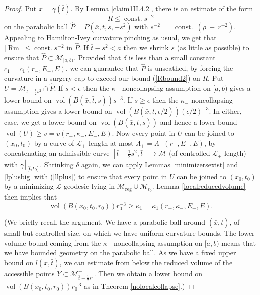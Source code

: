 \documentclass[12pt]{amsart}
\newcommand{\const}{\operatorname{const.}}
\renewcommand{\L}{{\mathcal L}}
\newcommand{\La}{\Lambda}
\newcommand{\M}{{\mathcal M}}
\newcommand{\reg}{\operatorname{reg}}
\newcommand{\restr}{\mbox{\Large \(|\)\normalsize}}
\newcommand{\Rm}{\operatorname{Rm}}
\newcommand{\vol}{\operatorname{vol}}
\newcommand{\de}{\delta}
\newcommand{\ga}{\gamma}
\newcommand{\ra}{\rightarrow}
\numberwithin{equation}{section}
\theoremstyle{plain}
\theoremstyle{definition}
\theoremstyle{remark}
\begin{document}
\begin{proof}
Put $\overline{x} = \gamma(\overline{t})$.
By Lemma \ref{claim1II.4.2}, there is an estimate of the form
\begin{equation}
\label{Rbound2}
R\leq \const s^{-2}
\end{equation}
on the parabolic ball 
$\hat P = P(\overline{x}, \bar t,s,-s^2)$ with 
$s^{-2} \: = \: \const \: (\rho \: + \: r_-^{-2})$.
Appealing to Hamilton-Ivey curvature pinching as 
usual, we get that $|\Rm|\leq \const s^{-2}$ in $\hat P$.
If $\overline{t} - s^2 < a$ then 
we shrink $s$ (as little as possible)
to ensure that $\hat P\subset\M_{[a,b)}$.
Provided that  $\bar \de$ is less than a small constant 
$c_1=c_1(r_-,E_-,E)$, 
we can guarantee that $\hat P$ is unscathed, by forcing the
curvature in a surgery cap to exceed our bound (\ref{Rbound2})
on $R$.  Put
$U= \M_{\bar t-\frac12 s^2}\cap \hat P$.  
If $s < \epsilon$ then
the $\kappa_-$-noncollapsing assumption on $[a,b)$  gives a lower bound
on $\vol(B(\bar x,\bar t,s))s^{-3}$. If $s \ge \epsilon$ then
the $\kappa_-$-noncollapsing assumption gives a lower bound
on $\vol(B(\bar x,\bar t,\epsilon/2)) (\epsilon/2)^{-3}$.
In either, case, we get a lower bound on $\vol(B(\bar x,\bar t,s))$ and
hence a lower bound
$\vol(U)\geq v=v(r_-,\kappa_-,E_-,E)$.
Now every point
in $U$ can be joined to $(x_0,t_0)$ by  a curve of 
$\L_+$-length at most $\La_+=\La_+(r_-,E_-,E)$,
by concatenating an admissible curve 
$[\bar t-\frac12 s^2,\bar t]\ra \M$ (of controlled
$\L_+$-length) with $\ga\restr_{[\bar t,t_0]}$.
Shrinking $\bar\de$ again, we can apply 
Lemmas \ref{minimizersexist} and \ref{lplusbig} with
(\ref{llplus}) to ensure that every point in 
$U$ can be joined to $(x_0,t_0)$ by a minimizing
$\L$-geodesic lying in $\M_{\reg}\cup \M_{t_0}$.  
Lemma \ref{localreducedvolume}
then implies that 
\begin{equation}
\label{kappa1}
\vol(B(x_0,t_0,r_0))r_0^{-3}\geq \kappa_1=\kappa_1(r_-,\kappa_-,E_-,E).
\end{equation}

(We briefly recall the argument. We have a parabolic ball around
$(\bar x, \bar t)$, of small but controlled size, on which we have
uniform curvature bounds.  The lower volume bound coming from
the $\kappa_-$-noncollapsing assumption
on $[a,b)$ means that we have bounded geometry on the parabolic ball.
As we have a fixed upper bound on $l(\bar x, \bar t)$, we can
estimate from below the reduced volume of the accessible points
$Y \subset \M_{\bar t-\frac12 s^2}^+$. Then we obtain a lower
bound on $\vol(B(x_0,t_0,r_0))r_0^{-3}$ as in Theorem 
\ref{nolocalcollapse}.)


\end{proof}
\end{document}
